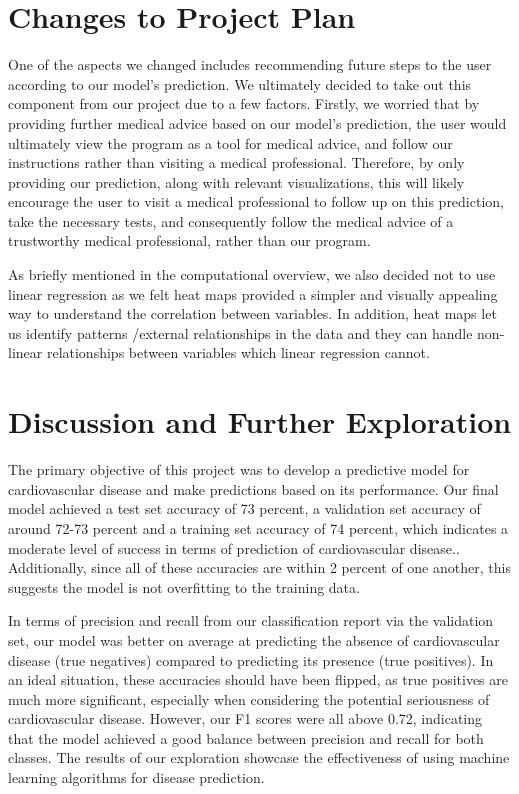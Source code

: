 ﻿\documentclass[12pt]{article}
\begin{document}
\section*{Changes to Project Plan}
One of the aspects we changed includes recommending future steps to the user according to our model’s prediction. We ultimately decided to take out this component from our project due to a few factors. Firstly, we worried that by providing further medical advice based on our model’s prediction, the user would ultimately view the program as a tool for medical advice, and follow our instructions rather than visiting a medical professional. Therefore, by only providing our prediction, along with relevant visualizations, this will likely encourage the user to visit a medical professional to follow up on this prediction, take the necessary tests, and consequently follow the medical advice of a trustworthy medical professional, rather than our program. 

As briefly mentioned in the computational overview, we also decided not to use linear regression as we felt heat maps provided a simpler and visually appealing way to understand the correlation between variables. In addition, heat maps let us identify patterns /external relationships in the data and they can handle non-linear relationships between variables which linear regression cannot. 


\section*{Discussion and Further Exploration}
The primary objective of this project was to develop a predictive model for cardiovascular disease and make predictions based on its performance. Our final model achieved a test set accuracy of 73 percent, a validation set accuracy of around 72-73 percent and a training set accuracy of 74 percent, which indicates a moderate level of success in terms of prediction of cardiovascular disease.. Additionally, since all of these accuracies are within 2 percent of one another, this suggests the model is not overfitting to the training data.  

In terms of precision and recall from our classification report via the validation set, our model was better on average at predicting the absence of cardiovascular disease (true negatives) compared to predicting its presence (true positives). In an ideal situation, these accuracies should have been flipped, as true positives are much more significant, especially when considering the potential seriousness of cardiovascular disease. However, our F1 scores were all above 0.72, indicating that the model achieved a good balance between precision and recall for both classes. The results of our exploration showcase the effectiveness of using machine learning algorithms for disease prediction. 
\end{document}
